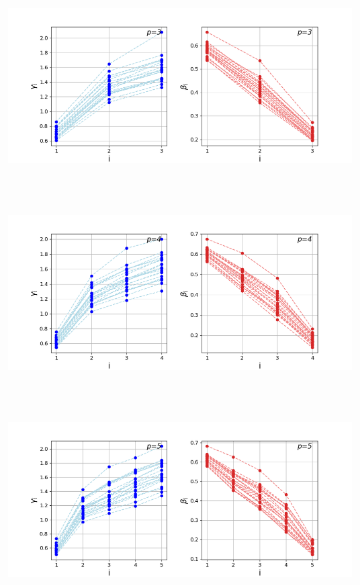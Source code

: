 \newpage
\begin{figure}[H]
	\centering
	\begin{subfigure}[t]{0.7\textwidth}
		\centering
		\includegraphics[width=\textwidth]{figures/interp/patterns/pattern_16-nodal_p-3_weighted.png}
	\end{subfigure}
	\\
	\centering
	\begin{subfigure}[t]{0.7\textwidth}
		\centering
		\includegraphics[width=\textwidth]{figures/interp/patterns/pattern_16-nodal_p-4_weighted.png}
	\end{subfigure}
	\\
	\centering
	\begin{subfigure}[t]{0.7\textwidth}
		\centering
		\includegraphics[width=\textwidth]{figures/interp/patterns/pattern_16-nodal_p-5_weighted.png}

\end{subfigure}
\end{figure}
